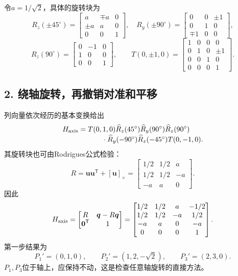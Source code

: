 令$a=1/\sqrt2$，具体的旋转块为
\[
R_z(\pm45^\circ)=\begin{bmatrix}a&\mp a&0\\\pm a&a&0\\0&0&1\end{bmatrix},\quad
R_y(\pm90^\circ)=\begin{bmatrix}0&0&\pm1\\0&1&0\\\mp1&0&0\end{bmatrix},
\]
\[
R_z(90^\circ)=\begin{bmatrix}0&-1&0\\1&0&0\\0&0&1\end{bmatrix},\qquad
T(0,\pm1,0)=\begin{bmatrix}1&0&0&0\\0&1&0&\pm1\\0&0&1&0\\0&0&0&1\end{bmatrix}.
\]

\subsection*{2. 绕轴旋转，再撤销对准和平移}
列向量依次经历的基本变换给出
\begin{align*}
H_{\rm axis}={}&T(0,1,0)\widehat R_z(45^\circ)\widehat R_y(90^\circ)
\widehat R_z(90^\circ)\\[-1mm]
&\qquad\cdot\widehat R_y(-90^\circ)\widehat R_z(-45^\circ)T(0,-1,0).
\end{align*}
其旋转块也可由Rodrigues公式检验：
\[
R=\boldsymbol u\boldsymbol u^{\mathsf T}+[\boldsymbol u]_\times
=\begin{bmatrix}1/2&1/2&a\\1/2&1/2&-a\\-a&a&0\end{bmatrix}.
\]
因此
\[
H_{\rm axis}=\begin{bmatrix}R&\boldsymbol q-R\boldsymbol q\\\boldsymbol0^{\mathsf T}&1\end{bmatrix}
=\begin{bmatrix}
1/2&1/2&a&-1/2\\
1/2&1/2&-a&1/2\\
-a&a&0&-a\\
0&0&0&1
\end{bmatrix}.
\]
第一步结果为
\[
P_1'=(0,1,0),\qquad P_2'=(1,2,-\sqrt2),\qquad P_3'=(2,3,0).
\]
$P_1,P_3$位于轴上，应保持不动，这是检查任意轴旋转的直接方法。

